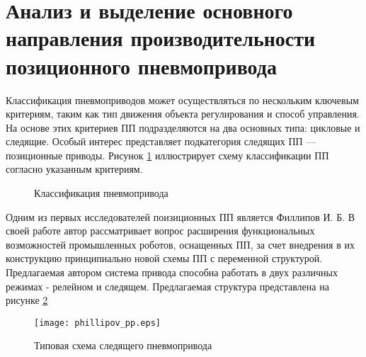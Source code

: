 
\section{Анализ и выделение основного направления производительности позиционного пневмопривода}\label{sec:ch1/sec2}

Классификация пневмоприводов может осуществляться по нескольким ключевым критериям,
таким как тип движения объекта регулирования и способ управления.
На основе этих критериев ПП подразделяются на два основных типа:
цикловые и следящие. Особый интерес представляет подкатегория следящих
ПП --- позиционные приводы.
Рисунок  \ref*{fig:actuators_scheme} иллюстрирует схему классификации
ПП согласно указанным критериям.


\begin{figure}[ht]
    \caption{Классификация пневмопривода}\label{fig:actuators_scheme}
\end{figure}

Одним из первых исследователей поизиционных ПП является Филлипов И. Б.
В своей работе \cite*{филиппов:позиц_след_пневмопривод}
автор рассматривает вопрос расширения функциональных возможностей промышленных роботов,
оснащенных ПП, за счет внедрения в их конструкцию принципиально
новой схемы ПП с переменной структурой. Предлагаемая автором система привода способна
работать в двух различных режимах - релейном и следящем. Предлагаемая структура представлена на рисунке \ref*{fig:phillipov_positioning}

\begin{figure}[h]
    \centerfloat
    \texttt{[image: phillipov\_pp.eps]}
    \caption{Типовая схема следящего пневмопривода}\label{fig:phillipov_positioning}
\end{figure}

